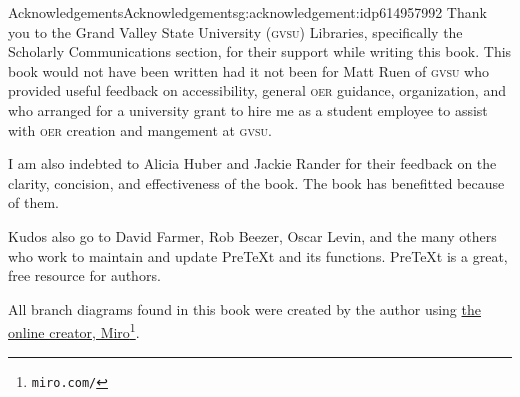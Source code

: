 \documentclass[oneside,10pt,]{book}
\newcommand{\initialism}[1]{\textsc{\MakeLowercase{#1}}}
\begin{document}
\typeout{************************************************}
%
\begin{acknowledgement}{Acknowledgements}{}{Acknowledgements}{}{}{g:acknowledgement:idp614957992}
Thank you to the Grand Valley State University (\initialism{GVSU}) Libraries, specifically the Scholarly Communications section, for their support while writing this book. This book would not have been written had it not been for Matt Ruen of \initialism{GVSU} who provided useful feedback on accessibility, general \initialism{OER} guidance, organization, and who arranged for a university grant to hire me as a student employee to assist with \initialism{OER} creation and mangement at \initialism{GVSU}.%
\par
I am also indebted to Alicia Huber and Jackie Rander for their feedback on the clarity, concision, and effectiveness of the book. The book has benefitted because of them.%
\par
Kudos also go to David Farmer, Rob Beezer, Oscar Levin, and the many others who work to maintain and update PreTeXt and its functions. PreTeXt is a great, free resource for authors.%
\par
All branch diagrams found in this book were created by the author using \href{https://miro.com/}{the online creator, Miro}\footnote{\nolinkurl{miro.com/}\label{g:fn:idp614956072}}.%
\end{acknowledgement}
%
%
\typeout{************************************************}
\typeout{************************************************}
%
\end{document}
